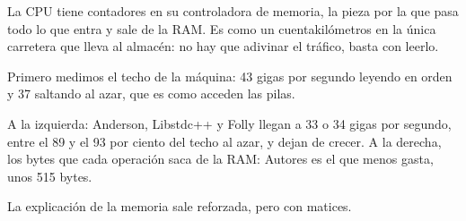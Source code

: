 La CPU tiene contadores en su controladora de memoria, la pieza por la que pasa todo lo que entra y sale de la RAM. Es como un cuentakilómetros en la única carretera que lleva al almacén: no hay que adivinar el tráfico, basta con leerlo.

Primero medimos el techo de la máquina: 43 gigas por segundo leyendo en orden y 37 saltando al azar, que es como acceden las pilas.

A la izquierda: Anderson, Libstdc++ y Folly llegan a 33 o 34 gigas por segundo, entre el 89 y el 93 por ciento del techo al azar, y dejan de crecer. A la derecha, los bytes que cada operación saca de la RAM: Autores es el que menos gasta, unos 515 bytes.

La explicación de la memoria sale reforzada, pero con matices.

